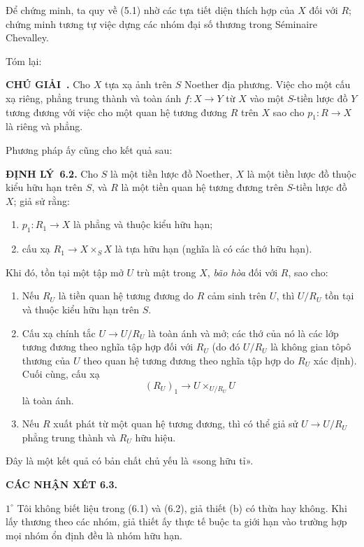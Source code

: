 \documentclass[11pt,twoside,openany]{book}
\numberwithin{equation}{section}
\newcommand{\src}[1]{%
  \phantomsection\hypertarget{src:\fgasourceid:#1}{}%
  \marginpar{\raggedleft\footnotesize\sffamily #1}%
}
\newcommand{\fgasourceid}{unset}
\newcommand{\result}[2]{\par\medskip\noindent\textbf{#1\if\relax\detokenize{#2}\relax\else\ #2\fi.}\quad}
\begin{document}
Để chứng minh, ta quy về (5.1) nhờ các tựa tiết diện thích hợp của $X$ đối với
$R$; chứng minh tương tự việc dựng các nhóm đại số thương trong Séminaire
Chevalley.

Tóm lại:

\result{CHÚ GIẢI}{} Cho $X$ tựa xạ ảnh trên $S$ Noether địa phương. Việc cho
một cấu xạ riêng, phẳng trung thành và toàn ánh $f:X\to Y$ từ $X$ vào một
$S$-tiền lược đồ $Y$ tương đương với việc cho một quan hệ tương đương $R$ trên
$X$ sao cho $p_1:R\to X$ là riêng và phẳng.

Phương pháp ấy cũng cho kết quả sau:

\result{ĐỊNH LÝ}{6.2} Cho $S$ là một tiền lược đồ Noether, $X$ là một tiền
lược đồ thuộc kiểu hữu hạn trên $S$, và $R$ là một tiền quan hệ tương đương trên
$S$-tiền lược đồ $X$; giả sử rằng:
\begin{enumerate}
\item[(a)] $p_1:R_1\to X$ là phẳng và thuộc kiểu hữu hạn;
\item[(b)] cấu xạ $R_1\to X\times_S X$ là tựa hữu hạn (nghĩa là có các thớ
hữu hạn).
\end{enumerate}
Khi đó, tồn tại một tập mở $U$ trù mật trong $X$, \emph{bão hòa} đối với $R$,
sao cho:
\begin{enumerate}
\item[(i)] Nếu $R_U$ là tiền quan hệ tương đương do $R$ cảm sinh trên $U$,
thì $U/R_U$ tồn tại và thuộc kiểu hữu hạn trên $S$.

\item[(ii)] Cấu xạ chính tắc $U\to U/R_U$ là toàn ánh và mở; các thớ của nó
là các lớp tương đương theo nghĩa tập hợp đối với $R_U$ (do đó $U/R_U$ là
không gian tôpô thương của $U$ theo quan hệ tương đương theo nghĩa tập hợp do
$R_U$ xác định). Cuối cùng, cấu xạ
\[
  (R_U)_1\longrightarrow U\times_{U/R_U}U
\]
là toàn ánh.
\src{114}

\item[(iii)] Nếu $R$ xuất phát từ một quan hệ tương đương, thì có thể giả sử
$U\to U/R_U$ phẳng trung thành và $R_U$ hữu hiệu.
\end{enumerate}

Đây là một kết quả có bản chất chủ yếu là «song hữu tỉ».

\medskip
\noindent\textbf{CÁC NHẬN XÉT 6.3.}

\smallskip
\noindent $1^\circ$ Tôi không biết liệu trong (6.1) và (6.2), giả thiết (b) có
thừa hay không. Khi lấy thương theo các nhóm, giả thiết ấy thực tế buộc ta
giới hạn vào trường hợp mọi nhóm ổn định đều là nhóm hữu hạn.
\end{document}
